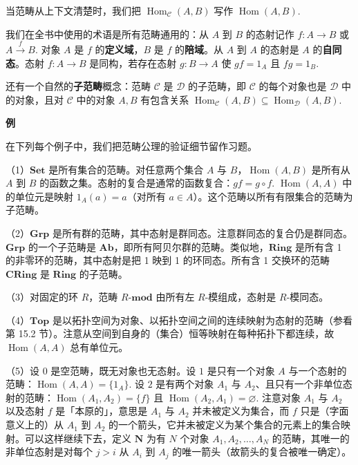 当范畴从上下文清楚时，我们把 \(\operatorname{Hom}_{\mathcal{C}}(A, B)\) 写作 \(\operatorname{Hom}(A, B)\).

我们在全书中使用的术语是所有范畴通用的：从 \(A\) 到 \(B\) 的态射记作 \(f : A \to B\) 或 \(A \xrightarrow{f} B\). 对象 \(A\) 是 \(f\) 的\textbf{定义域}，\(B\) 是 \(f\) 的\textbf{陪域}。从 \(A\) 到 \(A\) 的态射是 \(A\) 的\textbf{自同态}。态射 \(f : A \to B\) 是同构，若存在态射 \(g : B \to A\) 使 \(gf = 1_A\) 且 \(fg = 1_B\).

还有一个自然的\textbf{子范畴}概念：范畴 \(\mathcal{C}\) 是 \(\mathcal{D}\) 的子范畴，即 \(\mathcal{C}\) 的每个对象也是 \(\mathcal{D}\) 中的对象，且对 \(\mathcal{C}\) 中的对象 \(A, B\) 有包含关系 \(\operatorname{Hom}_{\mathcal{C}}(A, B) \subseteq \operatorname{Hom}_{\mathcal{D}}(A, B)\).

\noindent\textbf{例}

在下列每个例子中，我们把范畴公理的验证细节留作习题。

（1）\(\mathbf{Set}\) 是所有集合的范畴。对任意两个集合 \(A\) 与 \(B\)，\(\operatorname{Hom}(A, B)\) 是所有从 \(A\) 到 \(B\) 的函数之集。态射的复合是通常的函数复合：\(gf = g \circ f\). \(\operatorname{Hom}(A, A)\) 中的单位元是映射 \(1_A(a) = a\)（对所有 \(a \in A\)）。这个范畴以所有有限集合的范畴为子范畴。

（2）\(\mathbf{Grp}\) 是所有群的范畴，其中态射是群同态。注意群同态的复合仍是群同态。\(\mathbf{Grp}\) 的一个子范畴是 \(\mathbf{Ab}\)，即所有阿贝尔群的范畴。类似地，\(\mathbf{Ring}\) 是所有含 1 的非零环的范畴，其中态射是把 1 映到 1 的环同态。所有含 1 交换环的范畴 \(\mathbf{CRing}\) 是 \(\mathbf{Ring}\) 的子范畴。

（3）对固定的环 \(R\)，范畴 \(R\text{-}\mathbf{mod}\) 由所有左 \(R\)-模组成，态射是 \(R\)-模同态。

（4）\(\mathbf{Top}\) 是以拓扑空间为对象、以拓扑空间之间的连续映射为态射的范畴（参看第 15.2 节）。注意从空间到自身的（集合）恒等映射在每种拓扑下都连续，故 \(\operatorname{Hom}(A, A)\) 总有单位元。

（5）设 \(0\) 是空范畴，既无对象也无态射。设 \(1\) 是只有一个对象 \(A\) 与一个态射的范畴：\(\operatorname{Hom}(A, A) = \{1_A\}\). 设 \(2\) 是有两个对象 \(A_1\) 与 \(A_2\)、且只有一个非单位态射的范畴：\(\operatorname{Hom}(A_1, A_2) = \{f\}\) 且 \(\operatorname{Hom}(A_2, A_1) = \varnothing\). 注意对象 \(A_1\) 与 \(A_2\) 以及态射 \(f\) 是「本原的」，意思是 \(A_1\) 与 \(A_2\) 并未被定义为集合，而 \(f\) 只是（字面意义上的）从 \(A_1\) 到 \(A_2\) 的一个箭头，它并未被定义为某个集合的元素上的集合映射。可以这样继续下去，定义 \(\mathbf{N}\) 为有 \(N\) 个对象 \(A_1, A_2, \ldots, A_N\) 的范畴，其唯一的非单位态射是对每个 \(j > i\) 从 \(A_i\) 到 \(A_j\) 的唯一箭头（故箭头的复合被唯一确定）。

